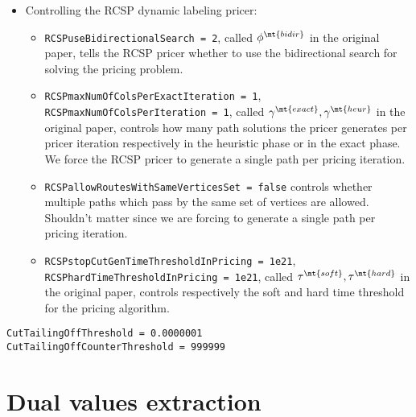 \begin{itemize}
	\item Controlling the RCSP dynamic labeling pricer:
	      \begin{itemize}
		      \item \texttt{RCSPuseBidirectionalSearch = 2}, called $\phi^\mt{bidir}$ in the original paper, tells the RCSP pricer whether to use the bidirectional search for solving the pricing problem.
		      \item \texttt{RCSPmaxNumOfColsPerExactIteration = 1}, \texttt{RCSPmaxNumOfColsPerIteration = 1}, called $\gamma^\mt{exact}, \gamma^\mt{heur}$ in the original paper, controls how many path solutions the pricer generates per pricer iteration respectively in the heuristic phase or in the exact phase.
		            We force the RCSP pricer to generate a single path per pricing iteration.
		      \item \texttt{RCSPallowRoutesWithSameVerticesSet = false} controls whether multiple paths which pass by the same set of vertices are allowed.
		            Shouldn't matter since we are forcing to generate a single path per pricing iteration.

		      \item \texttt{RCSPstopCutGenTimeThresholdInPricing = 1e21}, \texttt{RCSPhardTimeThresholdInPricing = 1e21}, called $\tau^\mt{soft}, \tau^\mt{hard}$ in the original paper, controls respectively the soft and hard time threshold for the pricing algorithm.
	      \end{itemize}
\end{itemize}

\begin{verbatim}
CutTailingOffThreshold = 0.0000001
CutTailingOffCounterThreshold = 999999
\end{verbatim}

\section{Dual values extraction}

